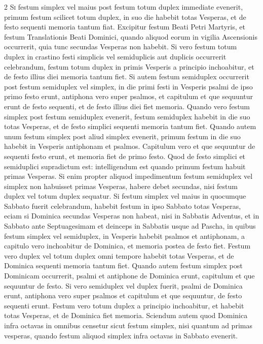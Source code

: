 \begin{multicols*}{2}
{\color{Red} }
\lettrine[lines=2]{\zallmancaps \color{Blue} S}{i} festum simplex vel maius post festum totum duplex immediate evenerit, primum festum scilicet totum duplex, in suo die habebit totas Vesperas, et de festo sequenti memoria tantum fiat.
Excipitur festum Beati Petri Martyris, et festum Translationis Beati Dominici, quando aliquod eorum in vigilia Ascensionis occurrerit, quia tunc secundas Vesperas non habebit.
Si vero festum totum duplex in crastino festi simplicis vel semiduplicis aut duplicis occurrerit celebrandum, festum totum duplex in primis Vesperis a principio inchoabitur, et de festo illius diei memoria tantum fiet.
Si autem festum semiduplex occurrerit post festum semiduplex vel simplex, in die primi festi in Vesperis psalmi de ipso primo festo erunt, antiphona vero super psalmos, et capitulum et que sequuntur erunt de festo sequenti, et de festo illius diei fiet memoria.
Quando vero festum simplex post festum semiduplex evenerit, festum semiduplex habebit in die suo totas Vesperas, et de festo simplici sequenti memoria tantum fiet.
Quando autem unum festum simplex post aliud simplex evenerit, primum festum in die suo habebit in Vesperis antiphonam et psalmos. Capitulum vero et que sequuntur de sequenti festo erunt, et memoria fiet de primo festo. Quod de festo simplici et semiduplici supradictum est: intelligendum est quando primum festum habuit primas Vesperas. Si enim propter aliquod impedimentum festum semiduplex vel simplex non habuisset primas Vesperas, habere debet secundas, nisi festum duplex vel totum duplex sequatur.
Si festum simplex vel maius in quocumque Sabbato fuerit celebrandum, habebit festum in ipso Sabbato totas Vesperas, eciam si Dominica secundas Vesperas non habeat, nisi in Sabbatis Adventus, et in Sabbato ante Septuagesimam et deinceps in Sabbatis usque ad Pascha, in quibus festum simplex vel semiduplex, in Vesperis habebit psalmos et antiphonam, a capitulo vero inchoabitur de Dominica, et memoria postea de festo fiet. Festum vero duplex vel totum duplex omni tempore habebit totas Vesperas, et de Dominica sequenti memoria tantum fiet.
Quando autem festum simplex post Dominicam occurrerit, psalmi et antiphone de Dominica erunt, capitulum et que sequuntur de festo. Si vero semiduplex vel duplex fuerit, psalmi de Dominica erunt, antiphona vero super psalmos et capitulum et que sequuntur, de festo sequenti erunt. Festum vero totum duplex a principio inchoabitur, et habebit totas Vesperas, et de Dominica fiet memoria.
Sciendum autem quod Dominica infra octavas in omnibus censetur sicut festum simplex, nisi quantum ad primas vesperas, quando festum aliquod simplex infra octavas in Sabbato evenerit.


\end{multicols*}
